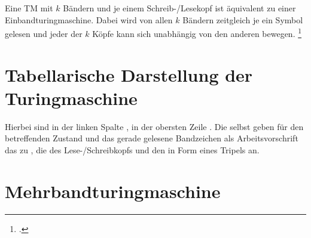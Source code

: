\documentclass{bschlangaul-theorie}
\begin{document}
Eine TM mit $k$ Bändern und je einem Schreib-/Lesekopf ist
äquivalent zu einer Einbandturingmaschine. Dabei wird von allen $k$
Bändern zeitgleich je ein Symbol gelesen und jeder der $k$ Köpfe
kann sich unabhängig von den anderen bewegen.
\footcite[Seite 26]{theo:fs:3}

\section{Tabellarische Darstellung der Turingmaschine}

Hierbei sind in der linken Spalte , in der obersten Zeile . Die  selbst geben für den
betreffenden Zustand und das gerade gelesene Bandzeichen als
Arbeitsvorschrift das zu , die
 des Lese-/Schreibkopfs und den 
in Form eines Tripels an.


\section{Mehrbandturingmaschine}

\literatur
\end{document}
